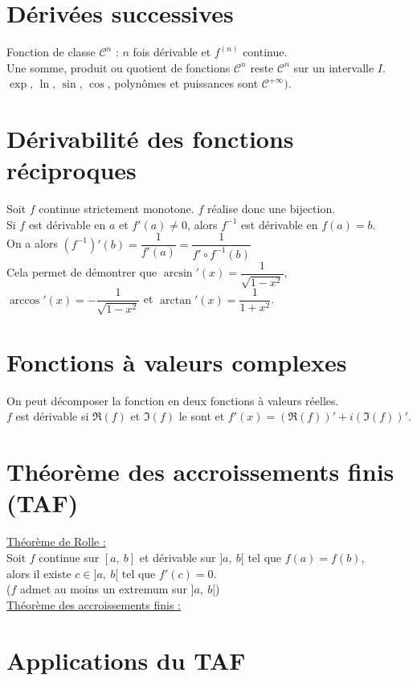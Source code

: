 \section{Dérivées successives}\label{sec:deriv-es-successives}

    Fonction de classe $\mathcal{C}^n$ : $n$ fois dérivable et $f^{(n)}$ continue.\\
    Une somme, produit ou quotient de fonctions $\mathcal{C}^n$ reste $\mathcal{C}^n$ sur un intervalle $I$.\\
    $\exp$, $\ln$, $\sin$, $\cos$, polynômes et puissances sont $\mathcal{C}^{+\infty})$.


\section{Dérivabilité des fonctions réciproques}\label{sec:derivabilite-des-fonctions-reciproques}

    Soit $f$ continue strictement monotone. $f$ réalise donc une bijection.\\

    Si $f$ est dérivable en $a$ et $f'(a) \neq 0$, alors $f^{-1}$ est dérivable en $f(a) = b$.\\

    On a alors $(f^{-1})'(b) = \dfrac{1}{f'(a)} = \dfrac{1}{f' \circ f^{-1}(b)}$\\

    Cela permet de démontrer que $\arcsin'(x) = \dfrac{1}{\sqrt{1 - x^2}}$, $\arccos'(x) = -\dfrac{1}{\sqrt{1 - x^2}}$ et $\arctan'(x) = \dfrac{1}{1 + x^2}$.


\section{Fonctions à valeurs complexes}\label{sec:fonctions-a-valeurs-complexes}

    On peut décomposer la fonction en deux fonctions à valeurs réelles.
    \vspace{3pt}\\
    $f$ est dérivable si $\Re(f)$ et $\Im(f)$ le sont et $f'(x) = (\Re(f))' + i (\Im(f))'$.


\section{Théorème des accroissements finis (TAF)}\label{sec:theoreme-des-accroissements-finis-(taf)}

    \underline{Théorème de Rolle :}\\
    Soit $f$ continue sur $[a,\ b]$ et dérivable sur $]a,\ b[$ tel que $f(a) = f(b)$,\\
    alors il existe $c \in ]a,\ b[$ tel que $f'(c) = 0$.\\
    ($f$ admet au moins un extremum sur $]a,\ b[$)\\

    \underline{Théorème des accroissements finis :}\\



\section{Applications du TAF}\label{sec:applications-du-taf}
